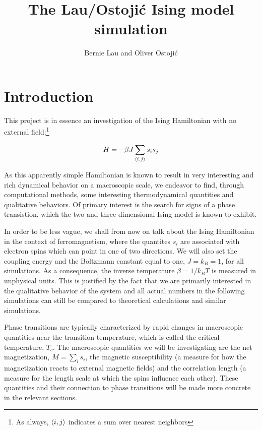 \documentclass[11pt,a4paper]{article}
\title{The Lau/Ostoji\'c Ising model simulation}
\date{}
\author{Bernie Lau and Oliver Ostoji\'c}
\DeclarePairedDelimiter{\avg}{\langle}{\rangle}
\begin{document}
\maketitle

\section{Introduction}

This project is in essence an investigation of the Ising Hamiltonian with no external field;\footnote{As always,
$\avg{i,j}$ indicates a sum over nearest neighbors}

\begin{equation}\label{eq:Hamiltonian}
    H = -\beta J \sum_{\avg*{i,j}} s_i s_j
\end{equation}

As this apparently simple Hamiltonian is known to result in very interesting and rich dynamical behavior on a 
 macroscopic scale, we endeavor to find, through computational methods, some interesting thermodynamical quantities
 and qualitative behaviors. Of primary interest is the search for signs of a phase transistion, which the two and three
 dimensional Ising model is known to exhibit.

 In order to be less vague, we shall from now on talk about the Ising Hamiltonian
 in the context of ferromagnetism, where the quantites $s_i$ are associated with electron spins which can point in one of two
 directions. We will also set the coupling energy and the Boltzmann canstant equal to one, 
 $J = k_B = 1$, for all simulations. As a consequence, the inverse temperature $\beta = 1/k_BT$ is measured in unphysical
 units. This is justified by the
 fact that  we are primarily interested in the qualitative behavior of the system and all actual numbers in the following
 simulations can still be compared to theoretical calculations and similar simulations.

 Phase transitions are typically characterized by rapid changes in macroscopic quantities near the transition temperature, which
 is called the critical temperature, $T_c$. The macroscopic quantities we will be investigating are the net magnetization,
 $M = \sum_i s_i$, the magnetic susceptibility (a measure for how the magnetization reacts to external magnetic fields) and
 the correlation length (a measure for the length scale at which the spins influence each other). These quantities and their
 connection to phase transitions will be made more concrete in the relevant sections. 
\end{document}
